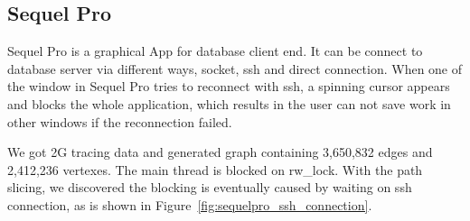 \subsection{Sequel Pro}
Sequel Pro is a graphical App for database client end.
It can be connect to database server via different ways, socket, ssh and direct connection.
When one of the window in Sequel Pro tries to reconnect with ssh, a spinning cursor appears and blocks the whole application,
which results in the user can not save work in other windows if the reconnection failed.

We got 2G tracing data and generated graph containing 3,650,832 edges and 2,412,236 vertexes.
The main thread is blocked on rw\_lock.
With the path slicing, we discovered the blocking is eventually caused by waiting on ssh connection, as is shown in Figure~\ref{fig:sequelpro_ssh_connection}.
